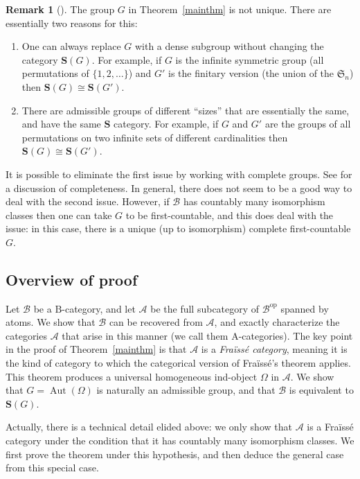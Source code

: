 \documentclass[12pt]{amsart}
\numberwithin{equation}{section}
\theoremstyle{definition}
\newtheorem{rmk}[equation]{Remark}
\newenvironment{remark}[1][]{\begin{rmk}[#1] \pushQED{\qed}}{\popQED \end{rmk}}
\newcommand{\cA}{\mathcal{A}}
\newcommand{\rA}{\mathrm{A}}
\newcommand{\cB}{\mathcal{B}}
\newcommand{\rB}{\mathrm{B}}
\newcommand{\bS}{\mathbf{S}}
\newcommand{\fS}{\mathfrak{S}}
\newcommand{\defn}[1]{\emph{#1}}
\DeclareMathOperator{\Aut}{Aut}
\newcommand{\op}{\mathrm{op}}
\begin{document}
\begin{remark}
The group $G$ in Theorem~\ref{mainthm} is not unique. There are essentially two reasons for this:
\begin{enumerate}
\item One can always replace $G$ with a dense subgroup without changing the category $\bS(G)$. For example, if $G$ is the infinite symmetric group (all permutations of $\{1,2,\ldots\}$) and $G'$ is the finitary version (the union of the $\fS_n$) then $\bS(G) \cong \bS(G')$.
\item There are admissible groups of different ``sizes'' that are essentially the same, and have the same $\bS$ category. For example, if $G$ and $G'$ are the groups of all permutations on two infinite sets of different cardinalities then $\bS(G) \cong \bS(G')$.
\end{enumerate}
It is possible to eliminate the first issue by working with complete groups. See \cite[\S 7]{pro-etale} for a discussion of completeness. In general, there does not seem to be a good way to deal with the second issue. However, if $\cB$ has countably many isomorphism classes then one can take $G$ to be first-countable, and this does deal with the issue: in this case, there is a unique (up to isomorphism) complete first-countable $G$.
\end{remark}

\subsection{Overview of proof}

Let $\cB$ be a $\rB$-category, and let $\cA$ be the full subcategory of $\cB^{\op}$ spanned by atoms. We show that $\cB$ can be recovered from $\cA$, and exactly characterize the categories $\cA$ that arise in this manner (we call them $\rA$-categories). The key point in the proof of Theorem~\ref{mainthm} is that $\cA$ is a \defn{Fra\"iss\'e category}, meaning it is the kind of category to which the categorical version of Fra\"iss\'e's theorem applies. This theorem produces a universal homogeneous ind-object $\Omega$ in $\cA$. We show that $G=\Aut(\Omega)$ is naturally an admissible group, and that $\cB$ is equivalent to $\bS(G)$.

Actually, there is a technical detail elided above: we only show that $\cA$ is a Fra\"iss\'e category under the condition that it has countably many isomorphism classes. We first prove the theorem under this hypothesis, and then deduce the general case from this special case.
\end{document}
